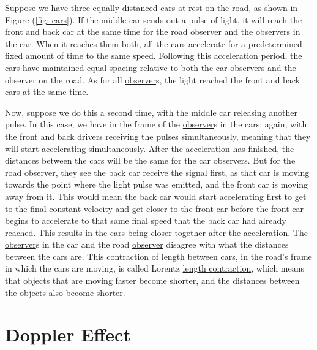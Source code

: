 Suppose we have three equally distanced cars at rest on the road, as shown in Figure (\ref{fig: cars}).
If the middle car sends out a pulse of light, it will reach the front and back car at the same time for the road \hyperlink{def-observer}{observer} and the \hyperlink{def-observer}{observer}s in the car. When it reaches them both, all the cars accelerate for a predetermined fixed amount of time to the same speed.
Following this acceleration period, the cars have maintained equal spacing relative to both the car observers and the observer on the road.
As for all \hyperlink{def-observer}{observer}s, the light reached the front and back cars at the same time.

Now, suppose we do this a second time, with the middle car releasing another pulse.
In this case, we have in the frame of the \hyperlink{def-observer}{observer}s in the cars: again, with the front and back drivers receiving the pulses simultaneously, meaning that they will start accelerating simultaneously.
After the acceleration has finished, the distances between the cars will be the same for the car observers.
But for the road \hyperlink{def-observer}{observer}, they see the back car receive the signal first, as that car is moving towards the point where the light pulse was emitted, and the front car is moving away from it.
This would mean the back car would start accelerating first to get to the final constant velocity and get closer to the front car before the front car begins to accelerate to that same final speed that the back car had already reached.
This results in the cars being closer together after the acceleration.
The \hyperlink{def-observer}{observer}s in the car and the road \hyperlink{def-observer}{observer} disagree with what the distances between the cars are.
This contraction of length between cars, in the road's frame in which the cars are moving, is called Lorentz \hyperlink{def-length-contraction}{length contraction}, which means that objects that are moving faster become shorter, and the distances between the objects also become shorter.

\section{Doppler Effect} \label{sect: Intro Doppler Effect}

